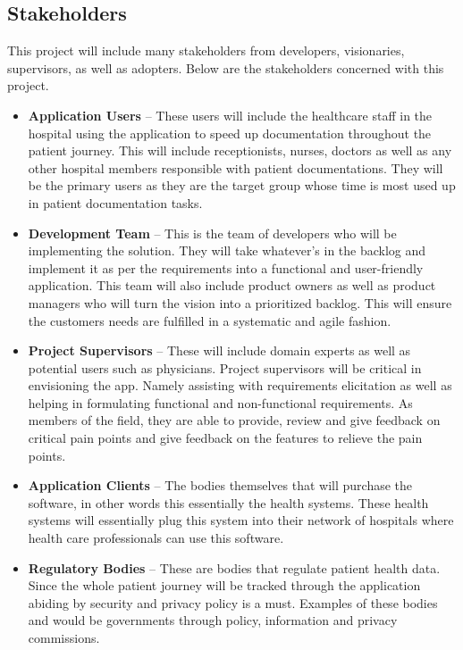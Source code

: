 \documentclass{article}
\begin{document}

\subsection{Stakeholders}

This project will include many stakeholders from developers, visionaries, supervisors, as well as adopters. Below are the stakeholders concerned with this project.
\begin{itemize}
    \item \textbf{Application Users} -- These users will include the healthcare staff in the hospital using the application to speed up documentation throughout the patient journey. This will include receptionists, nurses, doctors as well as any other hospital members responsible with patient documentations. They will be the primary users as they are the target group whose time is most used up in patient documentation tasks.
    \item \textbf{Development Team} -- This is the team of developers who will be implementing the solution. They will take whatever’s in the backlog and implement it as per the requirements into a functional and user-friendly application. This team will also include product owners as well as product managers who will turn the vision into a prioritized backlog. This will ensure the customers needs are fulfilled in a systematic and agile fashion.
    \item \textbf{Project Supervisors} -- These will include domain experts as well as potential users such as physicians. Project supervisors will be critical in envisioning the app. Namely assisting with requirements elicitation as well as helping in formulating functional and non-functional requirements. As members of the field, they are able to provide, review and give feedback on critical pain points and give feedback on the features to relieve the pain points.
    \item \textbf{Application Clients} -- The bodies themselves that will purchase the software, in other words this essentially the health systems. These health systems will essentially plug this system into their network of hospitals where health care professionals can use this software.
    \item \textbf{Regulatory Bodies} -- These are bodies that regulate patient health data. Since the whole patient journey will be tracked through the application abiding by security and privacy policy is a must. Examples of these bodies and would be governments through policy, information and privacy commissions.
\end{itemize}
\end{document}
